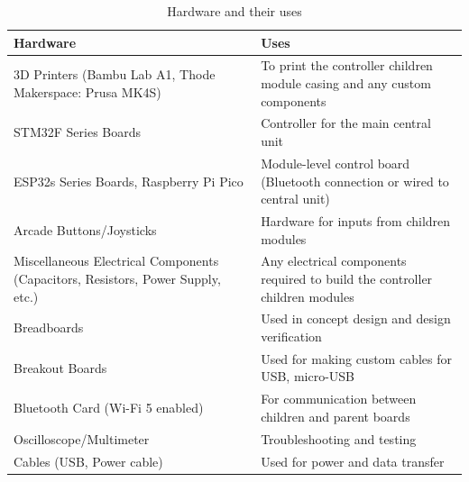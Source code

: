 \documentclass[a4]{article}
\begin{document}
\begin{table}[h!]
\centering
\renewcommand{\arraystretch}{1.2} %
\begin{tabularx}{\linewidth}{|X|X|}
\hline
\textcolor{McMasterMaroon}{\textbf{Hardware}} & \textcolor{McMasterMaroon}{\textbf{Uses}} \\
\hline
3D Printers (Bambu Lab A1, Thode Makerspace: Prusa MK4S) & To print the controller children module casing and any custom components \\
\hline
STM32F Series Boards & Controller for the main central unit \\
\hline
ESP32s Series Boards, Raspberry Pi Pico & Module-level control board (Bluetooth connection or wired to central unit) \\
\hline
Arcade Buttons/Joysticks & Hardware for inputs from children modules \\
\hline
Miscellaneous Electrical Components (Capacitors, Resistors, Power Supply, etc.) & Any electrical components required to build the controller children modules \\
\hline
Breadboards & Used in concept design and design verification \\
\hline
Breakout Boards & Used for making custom cables for USB, micro-USB \\
\hline
Bluetooth Card (Wi-Fi 5 enabled) & For communication between children and parent boards \\
\hline
Oscilloscope/Multimeter & Troubleshooting and testing \\
\hline
Cables (USB, Power cable) & Used for power and data transfer \\
\hline
\end{tabularx}
\caption{Hardware and their uses}
\end{table}
\end{document}
